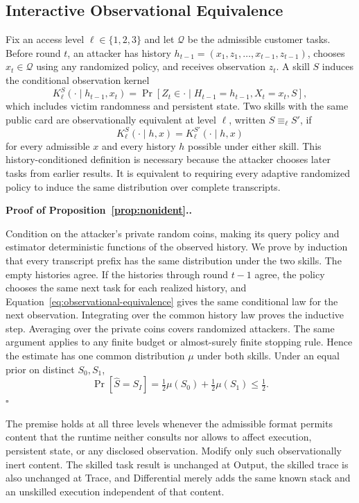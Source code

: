 \documentclass[letterpaper,twocolumn,10pt]{article}
\newcommand{\paragraphtitle}[1]{%
  \vspace{5pt}\noindent\textbf{#1.}%
}
\begin{document}
\subsection{Interactive Observational Equivalence}

Fix an access level $\ell\in\{1,2,3\}$ and let $\mathcal{Q}$ be the admissible
customer tasks.  Before round $t$, an attacker has history
$h_{t-1}=(x_1,z_1,\ldots,x_{t-1},z_{t-1})$, chooses
$x_t\in\mathcal{Q}$ using any randomized policy, and receives observation $z_t$.
A skill $S$ induces the conditional observation kernel
\begin{equation}
  K_\ell^S(\cdot\mid h_{t-1},x_t)
  =\Pr[Z_t\in\cdot\mid H_{t-1}=h_{t-1},X_t=x_t,S],
  \label{eq:interactive-kernel}
\end{equation}
which includes victim randomness and persistent state.  Two skills with the
same public card are observationally equivalent at level $\ell$, written
$S\equiv_\ell S'$, if
\begin{equation}
  K_\ell^S(\cdot\mid h,x)=K_\ell^{S'}(\cdot\mid h,x)
  \label{eq:observational-equivalence}
\end{equation}
for every admissible $x$ and every history $h$ possible under either skill.
This history-conditioned definition is necessary because the attacker chooses
later tasks from earlier results.  It is equivalent to requiring every adaptive
randomized policy to induce the same distribution over complete transcripts.

\paragraphtitle{Proof of Proposition~\ref{prop:nonident}.}
Condition on the attacker's private random coins, making its query policy and
estimator deterministic functions of the observed history.  We prove by
induction that every transcript prefix has the same distribution under the two
skills.  The empty histories agree.  If the histories through round $t-1$
agree, the policy chooses the same next task for each realized history, and
Equation~\ref{eq:observational-equivalence} gives the same conditional law for
the next observation.  Integrating over the common history law proves the
inductive step.  Averaging over the private coins covers randomized attackers.
The same argument applies to any finite budget or almost-surely finite stopping
rule.  Hence the estimate has one common distribution $\mu$ under both skills.
Under an equal prior on distinct $S_0,S_1$,
\[
  \Pr[\widehat{S}=S_I]
  =\tfrac12\mu(S_0)+\tfrac12\mu(S_1)\le\tfrac12.
\]
\hfill$\square$

The premise holds at all three levels whenever the admissible format permits
content that the runtime neither consults nor allows to affect execution,
persistent state, or any disclosed observation.  Modify only such
observationally inert content.  The skilled task result is unchanged at Output,
the skilled trace is also unchanged at Trace, and Differential merely adds the
same known stack and an unskilled execution independent of that content.
\end{document}
